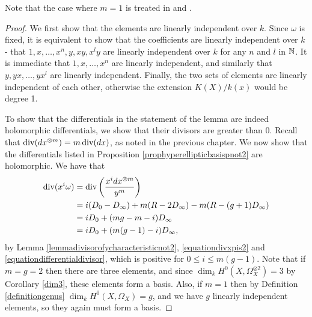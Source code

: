    \begin{rem}
    Note that the case where $m=1$ is treated in \cite[Prop. 7.4.26]{liu} and \cite[Ch. IV, \S 4, Prop. 4.3]{griffiths}.
    \end{rem}

    \begin{proof}
    We first show that the elements are linearly independent over $k$.
    Since $\omega$ is fixed, it is equivalent to show that the coefficients are linearly independent over $k$ - \ie that $1,x,\ldots ,x^n, y, xy, x^ly$ are linearly independent over $k$ for any $n$ and $l$ in ${\mathbb N}$.
    It is immediate that $1, x, \ldots, x^n$ are linearly independent, and similarly that $y, yx, \ldots, yx^l$ are linearly independent.
    Finally, the two sets of elements are linearly independent of each other, otherwise the extension $K(X)/k(x)$ would be degree 1.

    To show that the differentials in the statement of the lemma are indeed holomorphic differentials, we show that their divisors are greater than $0$.
    Recall that $\operatorname{div} (dx^{\otimes m}) =m\operatorname{div} (dx)$, as noted in the previous chapter.
    We now show that the differentials listed in Proposition \ref{prophyperellipticbasispnot2} are holomorphic.
    We have that
        \begin{equation}\label{eqbasedifferentialdivisor}
        \begin{split}
        \operatorname{div}(x^i\omega) & =  \operatorname{div} \left( \frac{x^idx^{\otimes m}}{y^m} \right)\\ 
        & =  i(D_0 -D_\infty) + m(R-2D_\infty) -m(R-(g+1)D_\infty) \\
        & =  iD_0 + (mg -m -i)D_\infty \\
        & =  iD_0 + (m(g-1) -i)D_\infty,
        \end{split}
        \end{equation}
    by Lemma \ref{lemmadivisorofycharacteristicnot2}, \eqref{equationdivxpis2} and \eqref{equationdifferentialdivisor}, which is positive for $0\leq i \leq m(g-1)$.
    Note that if $m=g=2$ then there are three elements, and since $\dim_kH^0(X,\Omega_X^{\otimes 2})=3$ by Corollary \ref{dim3}, these elements form a basis.
    Also, if $m=1$ then by Definition \ref{definitiongenus} $\dim_k H^0(X,\Omega_X)=g$, and we have $g$ linearly independent elements, so they again must form a basis.
    
    
    

\end{proof}
